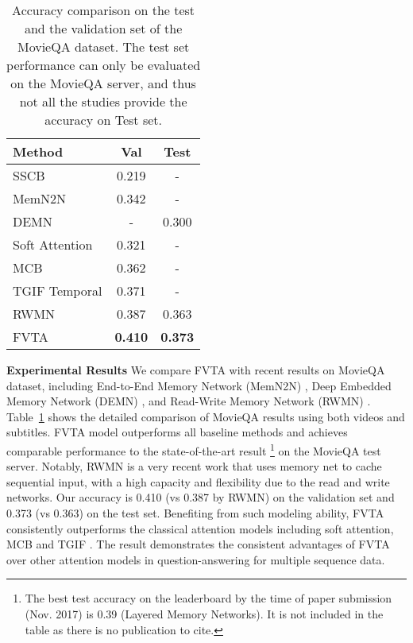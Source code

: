\begin{table}[]
\centering
\begin{tabular}{l||c|c}
\hline
Method            & Val & Test \\
\hline \hline
SSCB \cite{tapaswi2016movieqa}          & 0.219 & -\\
MemN2N \cite{tapaswi2016movieqa}        & 0.342 & -\\
DEMN \cite{kim2017deepstory} & - & 0.300\\
Soft Attention & 0.321 & -\\
MCB \cite{fukui2016multimodal}& 0.362 & -\\
TGIF Temporal \cite{jang2017tgif} & 0.371 & -\\
RWMN \cite{na2017read} & 0.387 & 0.363 \\
FVTA        & \textbf{0.410} & \textbf{0.373} \\
 \hline
\end{tabular}
\vspace{1mm}
\caption{Accuracy comparison on the test and the validation set of the MovieQA dataset. The test set performance can only be evaluated on the MovieQA server, and thus not all the studies provide the accuracy on Test set.
}
\label{exp-movieqa}
\end{table}

\noindent\textbf{Experimental Results}
We compare FVTA with recent results on MovieQA dataset, including End-to-End Memory Network (MemN2N) \cite{MovieQA}, Deep Embedded Memory Network (DEMN) \cite{kim2017deepstory}, and Read-Write Memory Network (RWMN) \cite{na2017read}. 
Table~\ref{exp-movieqa} shows the detailed comparison of MovieQA results using both videos and subtitles. FVTA model outperforms all baseline methods and achieves comparable performance to the state-of-the-art result \footnote{The best test accuracy on the leaderboard by the time of paper submission (Nov. 2017) is 0.39 (Layered Memory Networks). It is not included in the table as there is no publication to cite.} on the MovieQA test server. Notably, RWMN \cite{na2017read} is a very recent work that uses memory net to cache sequential input, with a high capacity and flexibility due to the read and write networks. Our accuracy is 0.410 (vs 0.387 by RWMN) on the validation set and 0.373 (vs 0.363) on the test set. Benefiting from such modeling ability,
FVTA consistently outperforms the classical attention models including soft attention, MCB \cite{fukui2016multimodal} and TGIF \cite{jang2017tgif}. The result demonstrates the consistent advantages of FVTA over other attention models in question-answering for multiple sequence data.


